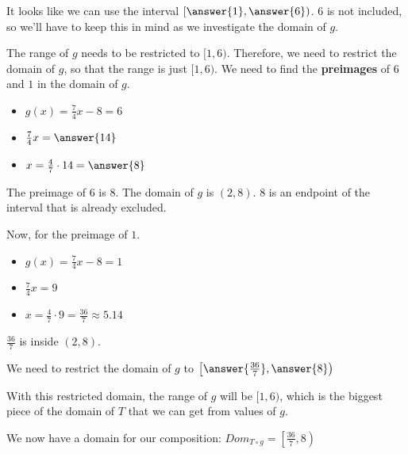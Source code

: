 \documentclass{ximera}
\begin{document}
\begin{explanation}



It looks like we can use the interval $\left[ \answer{1}, \answer{6} \right)$.   $6$ is not included, so we'll have to keep this in mind as we investigate the domain of $g$.


The range of $g$ needs to be restricted to $[1, 6)$.  Therefore, we need to restrict the domain of $g$, so that the range is just $[1, 6)$. We need to find the \textbf{preimages} of $6$ and $1$ in the domain of $g$.




\begin{itemize}
\item $g(x) = \frac{7}{4}x-8 = 6$
\item $\frac{7}{4}x = \answer{14}$
\item $x = \frac{4}{7} \cdot 14 = \answer{8}$
\end{itemize}


The preimage of $6$ is $8$.  The domain of $g$ is $(2,8)$. $8$ is an endpoint of the interval that is already excluded.


Now, for the preimage of $1$.

\begin{itemize}
\item $g(x) = \frac{7}{4}x-8 = 1$
\item $\frac{7}{4}x = 9$
\item $x = \frac{4}{7} \cdot 9 = \frac{36}{7} \approx 5.14$
\end{itemize}

$\frac{36}{7}$ is inside $(2,8)$.

We need to restrict the domain of $g$ to $\left[ \answer{\frac{36}{7}}, \answer{8} \right)$


With this restricted domain, the range of $g$ will be $[1, 6)$, which is the biggest piece of the domain of $T$ that we can get from values of $g$.

We now have a domain for our composition: $Dom_{T \circ g} = \left[\frac{36}{7}, 8\right)$

\end{explanation}
\end{document}
